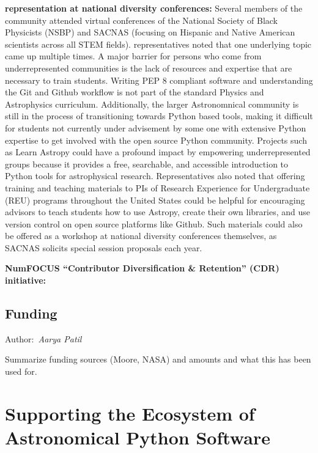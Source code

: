 \documentclass[modern]{aastex631}
\newcommand{\secauthor}[1]{{\color{blue}Author:~\textit{#1}}}
\begin{document}
\textbf{\astropy representation at national diversity conferences:}
Several members of the \astropy community attended virtual conferences
of the National Society of Black Physicists (NSBP) and SACNAS
(focusing on Hispanic and Native American scientists across all STEM
fields). \astropy representatives noted that one underlying topic came
up multiple times. A major barrier for persons who come from
underrepresented communities is the lack of resources and expertise
that are necessary to train students. Writing PEP 8 compliant software
and understanding the Git and Github workflow is not part of the
standard Physics and Astrophysics curriculum. Additionally, the larger
Astronomnical community is still in the process of transitioning
towards Python based tools, making it difficult for students not
currently under advisement by some one with extensive Python expertise
to get involved with the open source Python community. Projects such
as Learn Astropy could have a profound impact by empowering
underrepresented groups because it provides a free, searchable, and
accessible introduction to Python tools for astrophysical
research. Representatives also noted that offering training and
teaching materials to PIs of Research Experience for Undergraduate
(REU) programs throughout the United States could be helpful for
encouraging advisors to teach students how to use Astropy, create
their own libraries, and use version control on open source platforms
like Github. Such materials could also be offered as a workshop at
national diversity conferences themselves, as SACNAS solicits special
session proposals each year.

\textbf{NumFOCUS ``Contributor Diversification \& Retention'' (CDR)
  initiative:} 


\subsection{Funding} \label{sec:project-funding}

\secauthor{Aarya Patil}

Summarize funding sources (Moore, NASA) and amounts and what this has been used
for.


\section{Supporting the Ecosystem of Astronomical Python Software}
\label{sec:ecosystem}
\end{document}
